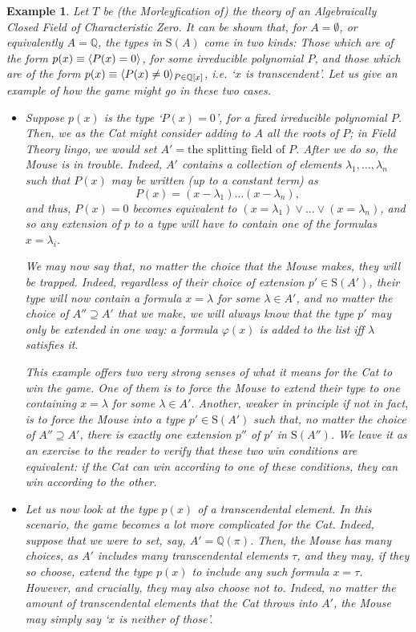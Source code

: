 \documentclass{article}
\newtheorem{example}[theorem]{Example}
\theoremstyle{nonumberplain}
\newcommand{\Q}{\mathbb{Q}}
\newcommand{\Stone}{\mathrm{S}}
\DeclarePairedDelimiter{\braket}{\langle}{\rangle}
\begin{document}
\begin{example}\label{ex:field}
Let $T$ be (the Morleyfication of) the theory of an Algebraically Closed Field of Characteristic Zero. It can be shown that, for $A = \emptyset$, or equivalently $A = \Q$, the types in $\Stone(A)$ come in two kinds: Those which are of the form $p(x) \equiv \braket{P(x) = 0}$, for some irreducible polynomial $P$, and those which are of the form $p(x) \equiv \braket{P(x) \neq 0}_{P \in \Q[x]}$, i.e. `$x$ is transcendent'. Let us give an example of how the game might go in these two cases.
\begin{itemize}
\item Suppose $p(x)$ is the type `$P(x) = 0$', for a fixed irreducible polynomial $P$. Then, we as the Cat might consider adding to $A$ all the roots of $P$; in Field Theory lingo, we would set $A' = \text{the splitting field of $P$}$. After we do so, the Mouse is in trouble. Indeed, $A'$ contains a collection of elements $\lambda_1, \dots, \lambda_n$ such that $P(x)$ may be written (up to a constant term) as
\begin{equation}
P(x) = (x - \lambda_1)\dots(x - \lambda_n),
\end{equation}
and thus, $P(x) = 0$ becomes equivalent to $(x = \lambda_1) \lor \dots \lor (x = \lambda_n)$, and so any extension of $p$ to a type will have to contain one of the formulas $x = \lambda_i$.

We may now say that, no matter the choice that the Mouse makes, they will be trapped. Indeed, regardless of their choice of extension $p' \in \Stone(A')$, their type will now contain a formula $x = \lambda$ for some $\lambda \in A'$, and no matter the choice of $A'' \supseteq A'$ that we make, we will always know that the type $p'$ may only be extended in one way: a formula $\varphi(x)$ is added to the list iff $\lambda$ satisfies it.

This example offers two very strong senses of what it means for the Cat to win the game. One of them is to force the Mouse to extend their type to one containing $x = \lambda$ for some $\lambda \in A'$. Another, weaker in principle if not in fact, is to force the Mouse into a type $p' \in \Stone(A')$ such that, no matter the choice of $A'' \supseteq A'$, there is exactly one extension $p''$ of $p'$ in $\Stone(A'')$. We leave it as an exercise to the reader to verify that these two win conditions are equivalent: if the Cat can win according to one of these conditions, they can win according to the other.

\item Let us now look at the type $p(x)$ of a transcendental element. In this scenario, the game becomes a lot more complicated for the Cat. Indeed, suppose that we were to set, say, $A' = \Q(\pi)$. Then, the Mouse has many choices, as $A'$ includes many transcendental elements $\tau$, and they may, if they so choose, extend the type $p(x)$ to include any such formula $x = \tau$. However, and crucially, they may also choose not to. Indeed, no matter the amount of transcendental elements that the Cat throws into $A'$, the Mouse may simply say `$x$ is neither of those'.


\end{itemize}
\end{example}
\end{document}
